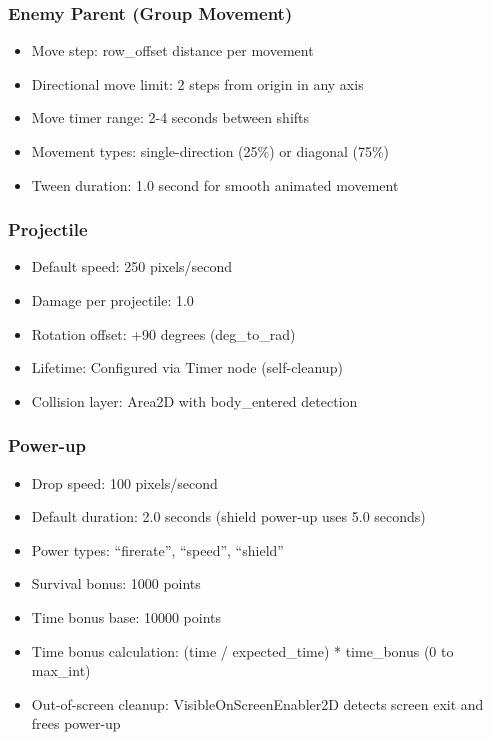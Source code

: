 \documentclass{article}
\begin{document}
\subsubsection{Enemy Parent (Group Movement)}
\begin{itemize}
    \item Move step: row\_offset distance per movement
    \item Directional move limit: 2 steps from origin in any axis
    \item Move timer range: 2-4 seconds between shifts
    \item Movement types: single-direction (25\%) or diagonal (75\%)
    \item Tween duration: 1.0 second for smooth animated movement
\end{itemize}

\subsubsection{Projectile}
\begin{itemize}
    \item Default speed: 250 pixels/second
    \item Damage per projectile: 1.0
    \item Rotation offset: +90 degrees (deg\_to\_rad)
    \item Lifetime: Configured via Timer node (self-cleanup)
    \item Collision layer: Area2D with body\_entered detection
\end{itemize}

\subsubsection{Power-up}
\begin{itemize}
    \item Drop speed: 100 pixels/second
    \item Default duration: 2.0 seconds (shield power-up uses 5.0 seconds)
    \item Power types: ``firerate'', ``speed'', ``shield''
    \item Survival bonus: 1000 points
    \item Time bonus base: 10000 points
    \item Time bonus calculation: (time / expected\_time) * time\_bonus (0 to max\_int)
    \item Out-of-screen cleanup: VisibleOnScreenEnabler2D detects screen exit and frees power-up
\end{itemize}
\end{document}
